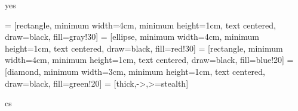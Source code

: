 \def\LangCS{cs}
\def\LangEN{en}
\def\ConfirmExpr{yes}




\ifx\PackagesIncludeTikz\ConfirmExpr
	\usepackage{memoize}
	\usepackage{collargs}
	\usepackage{tikz}
	\usepackage{tikz-cd}
	\usepackage{circuitikz}

	\usetikzlibrary{calc}
	\usetikzlibrary{fadings}
	\usetikzlibrary{shapes.geometric, arrows, positioning}

	 = [rectangle, minimum width=4cm, minimum height=1cm, text centered, draw=black, fill=gray!30]
	 = [ellipse, minimum width=4cm, minimum height=1cm, text centered, draw=black, fill=red!30]
	 = [rectangle, minimum width=4cm, minimum height=1cm, text centered, draw=black, fill=blue!20]
	 = [diamond, minimum width=3cm, minimum height=1cm, text centered, draw=black, fill=green!20]
	 = [thick,->,>=stealth]
\fi




\ifx\DocLanguage\LangCS
	\usepackage[czech]{babel}
\else
	\usepackage[english]{babel}
\fi


\usepackage[T1]{fontenc}
\usepackage[utf8]{inputenc}
\usepackage{lmodern,textcomp}

\usepackage[a-2u]{pdfx}         %
\usepackage{graphicx}						%
\usepackage{caption}						%
\usepackage{subcaption} 				%
\usepackage{hyperref} 					%
\usepackage{tabularx}           %
\usepackage{xcolor,colortbl}    %
\usepackage{textpos}            %
\usepackage{longtable}          %
\usepackage{fancyhdr}						%
\usepackage{xurl}								%
\usepackage{enumitem}           %
\usepackage{multicol}           %

